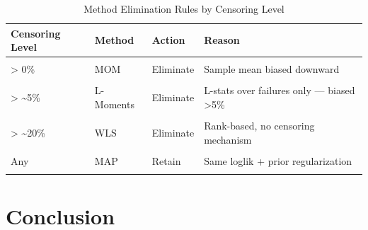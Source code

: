 \documentclass[
]{article}
\newenvironment{Shaded}{\begin{snugshade}}{\end{snugshade}}
\newcommand{\ControlFlowTok}[1]{\textcolor[rgb]{0.13,0.29,0.53}{\textbf{#1}}}
\newcommand{\DecValTok}[1]{\textcolor[rgb]{0.00,0.00,0.81}{#1}}
\newcommand{\FunctionTok}[1]{\textcolor[rgb]{0.13,0.29,0.53}{\textbf{#1}}}
\newcommand{\NormalTok}[1]{#1}
\newcommand{\OtherTok}[1]{\textcolor[rgb]{0.56,0.35,0.01}{#1}}
\newcommand{\SpecialCharTok}[1]{\textcolor[rgb]{0.81,0.36,0.00}{\textbf{#1}}}
\newcommand{\StringTok}[1]{\textcolor[rgb]{0.31,0.60,0.02}{#1}}
\begin{document}
\begin{longtable}[t]{llll}
\caption{\label{tab:decision-table}Method Elimination Rules by Censoring Level}\\
\toprule
Censoring Level & Method & Action & Reason\\
\midrule
\cellcolor{gray!10}{> 0\%} & \cellcolor{gray!10}{Percentile} & \cellcolor{gray!10}{Eliminate} & \cellcolor{gray!10}{Cannot place censored units on CDF}\\
> 0\% & MOM & Eliminate & Sample mean biased downward\\
\cellcolor{gray!10}{> 0\%} & \cellcolor{gray!10}{EPF} & \cellcolor{gray!10}{Eliminate} & \cellcolor{gray!10}{Cannot include censored obs in E[v³]}\\
> \textasciitilde{}5\% & L-Moments & Eliminate & L-stats over failures only — biased >5\%\\
\cellcolor{gray!10}{> \textasciitilde{}20\%} & \cellcolor{gray!10}{OLS} & \cellcolor{gray!10}{Eliminate} & \cellcolor{gray!10}{Rank-based, no censoring mechanism}\\
\addlinespace
> \textasciitilde{}20\% & WLS & Eliminate & Rank-based, no censoring mechanism\\
\cellcolor{gray!10}{Any} & \cellcolor{gray!10}{MLE} & \cellcolor{gray!10}{Retain} & \cellcolor{gray!10}{Censored loglik handles natively}\\
Any & MAP & Retain & Same loglik + prior regularization\\
\cellcolor{gray!10}{Any} & \cellcolor{gray!10}{MCMC} & \cellcolor{gray!10}{Retain} & \cellcolor{gray!10}{Full posterior with censoring (extension)}\\
\bottomrule
\end{longtable}

\section{Conclusion}\label{conclusion}

\begin{Shaded}
\end{Shaded}
\end{document}
